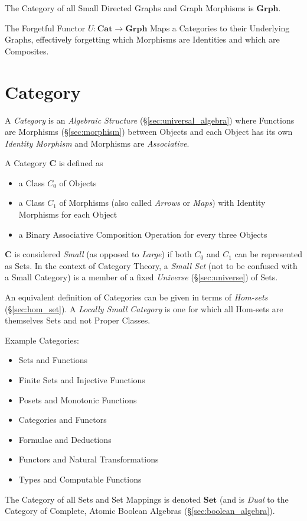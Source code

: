 The Category of all Small Directed Graphs and Graph Morphisms is
$\mathbf{Grph}$.

The Forgetful Functor $U : \mathbf{Cat} \rightarrow \mathbf{Grph}$
Maps a Categories to their Underlying Graphs, effectively forgetting
which Morphisms are Identities and which are Composites.



\section{Category}\label{sec:category}

A \emph{Category} is an \emph{Algebraic Structure}
(\S\ref{sec:universal_algebra}) where Functions are Morphisms
(\S\ref{sec:morphism}) between Objects and each Object has
its own \emph{Identity Morphism} and Morphisms are \emph{Associative}.

A Category $\mathbf{C}$ is defined as
\begin{itemize}
\item a Class $C_0$ of Objects
\item a Class $C_1$ of Morphisms (also called \emph{Arrows} or
  \emph{Maps}) with Identity Morphisms for each Object
\item a Binary Associative Composition Operation for every three
  Objects
\end{itemize}
$\mathbf{C}$ is considered \emph{Small} (as opposed to \emph{Large})
if both $C_0$ and $C_1$ can be represented as Sets. In the context of
Category Theory, a \emph{Small Set} (not to be confused with a Small
Category) is a member of a fixed \emph{Universe}
(\S\ref{sec:universe}) of Sets.

An equivalent definition of Categories can be given in terms of
\emph{Hom-sets} (\S\ref{sec:hom_set}). A \emph{Locally Small
Category} is one for which all Hom-sets are themselves Sets and not
  Proper Classes.

Example Categories:
\begin{itemize}
\item Sets and Functions
\item Finite Sets and Injective Functions
\item Posets and Monotonic Functions
\item Categories and Functors
\item Formulae and Deductions
\item Functors and Natural Transformations
\item Types and Computable Functions
\end{itemize}
The Category of all Sets and Set Mappings is denoted $\mathbf{Set}$
(and is \emph{Dual} to the Category of Complete, Atomic Boolean
Algebras (\S\ref{sec:boolean_algebra}).

